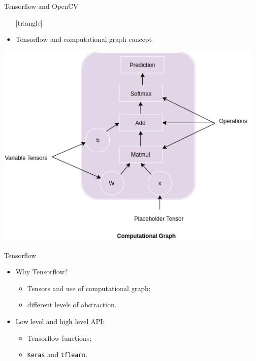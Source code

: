 \documentclass{beamer}
\begin{document}
\begin{frame}{Tensorflow and OpenCV}
	\begin{itemize}
		\setlength\itemsep{1em}
		[triangle]
		\item 
			Tensorflow and computational graph concept
	\end{itemize}
	\begin{center}
    		\includegraphics[scale=0.4]{comp}
	\end{center}
\end{frame}

\begin{frame}{Tensorflow}
	\begin{itemize}
		\setlength\itemsep{1em}
		[triangle]
		\item
			Why Tensorflow?
			\begin{itemize}
				[circle]
				\item 
					Tensors and use of computational graph;
				\item 
					different levels of abstraction.
			\end{itemize}
		\item 
			Low level and high level API:
			\begin{itemize}
				[circle]
				\item 
					Tensorflow functions;
				\item 
					\texttt{Keras} and \texttt{tflearn}.
			\end{itemize}
	\end{itemize}
\end{frame}
\end{document}
